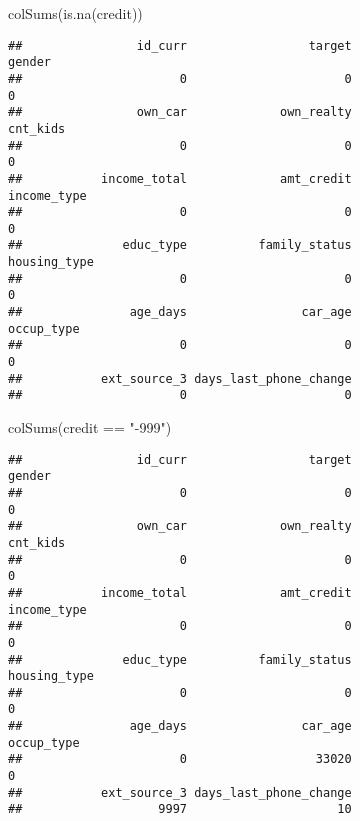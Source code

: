 \documentclass[
]{article}
\newenvironment{Shaded}{\begin{snugshade}}{\end{snugshade}}
\newcommand{\FunctionTok}[1]{\textcolor[rgb]{0.00,0.00,0.00}{#1}}
\newcommand{\NormalTok}[1]{#1}
\newcommand{\SpecialCharTok}[1]{\textcolor[rgb]{0.00,0.00,0.00}{#1}}
\newcommand{\StringTok}[1]{\textcolor[rgb]{0.31,0.60,0.02}{#1}}
\begin{document}
\begin{Shaded}
\begin{Highlighting}[]
\FunctionTok{colSums}\NormalTok{(}\FunctionTok{is.na}\NormalTok{(credit))}
\end{Highlighting}
\end{Shaded}

\begin{verbatim}
##                id_curr                 target                 gender 
##                      0                      0                      0 
##                own_car             own_realty               cnt_kids 
##                      0                      0                      0 
##           income_total             amt_credit            income_type 
##                      0                      0                      0 
##              educ_type          family_status           housing_type 
##                      0                      0                      0 
##               age_days                car_age             occup_type 
##                      0                      0                      0 
##           ext_source_3 days_last_phone_change 
##                      0                      0
\end{verbatim}

\begin{Shaded}
\begin{Highlighting}[]
\FunctionTok{colSums}\NormalTok{(credit }\SpecialCharTok{==} \StringTok{"{-}999"}\NormalTok{)}
\end{Highlighting}
\end{Shaded}

\begin{verbatim}
##                id_curr                 target                 gender 
##                      0                      0                      0 
##                own_car             own_realty               cnt_kids 
##                      0                      0                      0 
##           income_total             amt_credit            income_type 
##                      0                      0                      0 
##              educ_type          family_status           housing_type 
##                      0                      0                      0 
##               age_days                car_age             occup_type 
##                      0                  33020                      0 
##           ext_source_3 days_last_phone_change 
##                   9997                     10
\end{verbatim}
\end{document}
